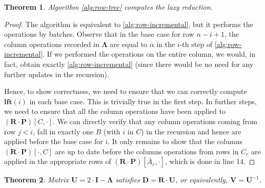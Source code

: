\documentclass[10pt,a4paper]{article}
\newtheorem{theorem}{Theorem}[section]
\newcommand{\mat}[1]{\mathbf{#1}}
\newcommand{\lft}{\mathbf{lft}}
\begin{document}
\begin{theorem}
Algorithm \ref{alg:row-tree} computes the lazy reduction.
\end{theorem}

\begin{proof}
The algorithm is equivalent to \cref{alg:row-incremental}, but it performs the operations by batches. Observe that in the base case for row $n-i+1$, the column operations recorded in $\mat{\Lambda}$ are equal to $\alpha$ in the $i$-th step of \cref{alg:row-incremental}. If we performed the operations on the entire column, we would, in fact, obtain exactly \cref{alg:row-incremental} (since there would be no need for any further updates in the recursion). 

Hence, to show correctness, we need to ensure that we can correctly compute $\lft(i)$ in each base case. This is trivially true in the first step. In further steps, we need to ensure that all the column operations have been applied to $(\mat{R}\cdot \mat{P})[C,\cdot]$. We can directly verify that any column operations coming from row $j<i$, fall in exactly one $B$ (with $i$ in $C$) in the recursion and hence are applied before the base case for $i$.
%
It only remains to show that the columns $(\mat{R}\cdot \mat{P})[\cdot,C]$ are up to date before the columns operations from rows in $C_r$ are applied in the appropriate rows of $(\mat{R}\cdot \mat{P})[\bar{A}_r,\cdot]$, which is done in line 14. 
\end{proof}



\begin{theorem}
    Matrix $\mat{U} = 2\cdot \mat{I} - \mat{\Lambda}$ satisfies $\mat{D} = \mat{R} \cdot \mat{U}$, or equivalently, $\mat{V} = \mat{U}^{-1}$.
\end{theorem}
\end{document}
